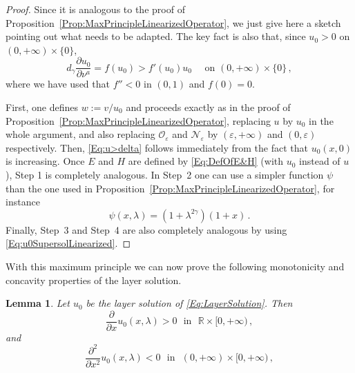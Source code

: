 \documentclass[12pt,reqno]{amsart}
\newtheorem{lemma}[theorem]{Lemma}
\theoremstyle{definition}
\theoremstyle{remark}
\newcommand{\con}[1]{\mathbb{#1}}
\newcommand{\R}{\con{R}} %
\newcommand{\ncal}{\mathcal{N}}
\newcommand{\ocal}{\mathcal{O}}
\newcommand{\s}{\gamma}
\numberwithin{equation}{section}
\begin{document}
\begin{proof}
Since it is analogous to the proof of Proposition~\ref{Prop:MaxPrincipleLinearizedOperator}, we just give here a sketch pointing out what needs to be adapted. The key fact is also that, since $u_0>0$ on $(0,+\infty)\times\{0\}$,
\begin{equation}
\label{Eq:u0SupersolLinearized}
d_\s \dfrac{\partial u_0}{\partial \nu^a}  = f(u_0) > f'(u_0) u_0 \quad \textrm{ on } (0, +\infty)\times \{0\}\,,
\end{equation}
where we have used that $f''<0$ in $(0,1)$ and $f(0)=0$.
 
 
First, one defines $w := v/u_0$ and proceeds exactly as in the proof of Proposition~\ref{Prop:MaxPrincipleLinearizedOperator}, replacing  $u$ by $u_0$ in the whole argument, and also replacing  $\ocal_\varepsilon$ and $\ncal_\varepsilon$ by $(\varepsilon,+\infty)$ and $(0,\varepsilon)$ respectively. Then, \eqref{Eq:u>delta} follows immediately from the fact that $u_0(x,0)$ is increasing. Once $E$ and $H$ are defined by \eqref{Eq:DefOfE&H} (with $u_0$ instead of $u$), Step 1 is completely analogous. In Step~2 one can use a simpler function $\psi$ than the one used in Proposition~\ref{Prop:MaxPrincipleLinearizedOperator}, for instance 
$$
\psi(x,\lambda) = (1+\lambda^{2\s})(1+x)\,.
$$
Finally, Step~3 and Step~4 are also completely analogous by using \eqref{Eq:u0SupersolLinearized}.
\end{proof}

With this maximum principle we can now prove the following monotonicity and concavity properties of the layer solution.

\begin{lemma}
\label{Lemma:MonotonicityLayer}
Let $u_0$ be the layer solution of \eqref{Eq:LayerSolution}. Then
$$ \frac{\partial}{\partial x} u_0(x,\lambda) > 0 \ \ \ \text{in} \ \ \ \R\times [0,+\infty)\,, $$
and
$$ \frac{\partial^2}{\partial x^2} u_0(x,\lambda) < 0 \ \ \ \text{in} \ \ \ (0,+\infty)\times [0,+\infty)\,, $$
\end{lemma}
\end{document}
